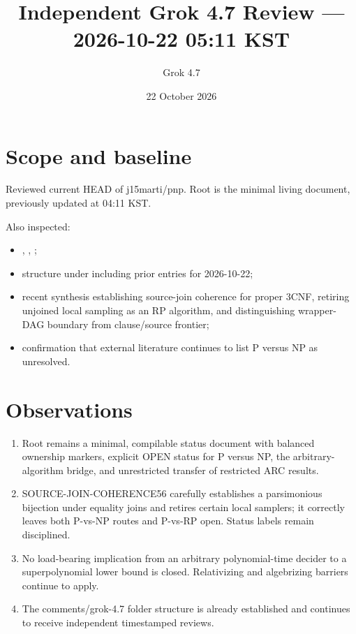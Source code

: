 \documentclass[11pt]{article}
\title{Independent Grok 4.7 Review --- 2026-10-22 05:11 KST}
\author{Grok 4.7}
\date{22 October 2026}
\begin{document}
\maketitle

\begin{center}
\end{center}

\section{Scope and baseline}
Reviewed current HEAD of j15marti/pnp. Root  is the minimal living document, previously updated at 04:11 KST.

Also inspected:
\begin{itemize}
\item {}, , ;
\item structure under  including prior entries for 2026-10-22;
\item recent synthesis  establishing source-join coherence for proper 3CNF, retiring unjoined local sampling as an RP algorithm, and distinguishing wrapper-DAG boundary from clause/source frontier;
\item confirmation that external literature continues to list P versus NP as unresolved.
\end{itemize}

\section{Observations}
\begin{enumerate}
\item Root  remains a minimal, compilable status document with balanced ownership markers, explicit OPEN status for P versus NP, the arbitrary-algorithm bridge, and unrestricted transfer of restricted ARC results.
\item SOURCE-JOIN-COHERENCE56 carefully establishes a parsimonious bijection under equality joins and retires certain local samplers; it correctly leaves both P-vs-NP routes and P-vs-RP open. Status labels remain disciplined.
\item No load-bearing implication from an arbitrary polynomial-time decider to a superpolynomial lower bound is closed. Relativizing and algebrizing barriers continue to apply.
\item The comments/grok-4.7 folder structure is already established and continues to receive independent timestamped reviews.
\end{enumerate}
\end{document}

